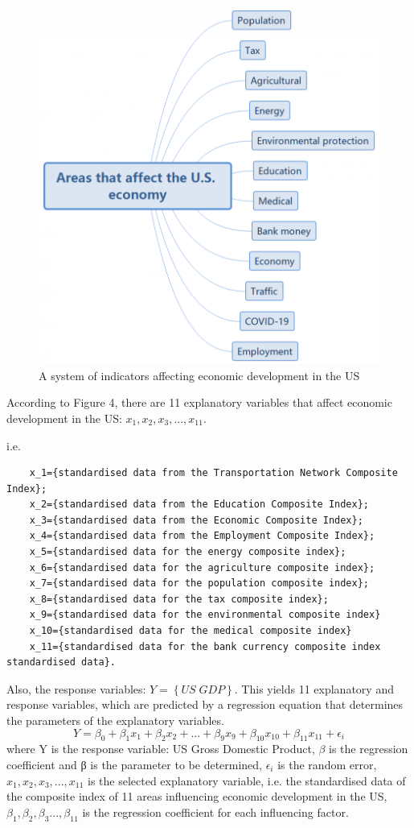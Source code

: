 \documentclass{apmcmthesis}
\begin{document}
\begin{figure}[H]
	\centering
	\includegraphics[width=0.65\linewidth]{screenshot005}
	\caption{A system of indicators affecting economic development in the US}
	\label{fig:screenshot005}
\end{figure}

According to Figure 4, there are 11 explanatory variables that affect economic development in the US: $ x_1,x_2,x_3,...,x_{11} $.

i.e.
\begin{lstlisting}
	x_1={standardised data from the Transportation Network Composite Index};
	x_2={standardised data from the Education Composite Index};
	x_3={standardised data from the Economic Composite Index};
	x_4={standardised data from the Employment Composite Index};
	x_5={standardised data for the energy composite index}; 
	x_6={standardised data for the agriculture composite index};
	x_7={standardised data for the population composite index}; 
	x_8={standardised data for the tax composite index}; 
	x_9={standardised data for the environmental composite index}
	x_10={standardised data for the medical composite index}
	x_11={standardised data for the bank currency composite index standardised data}. 
\end{lstlisting}

Also, the response variables: $ Y =\left\lbrace US\;GDP\right\rbrace  $. This yields 11 explanatory and response variables, which are predicted by a regression equation that determines the parameters of the explanatory variables. 
\begin{equation}
Y = \beta_0 + \beta_1x_1 + \beta_2x_2 + ...+ \beta_9x_9 + \beta_{10}x_{10} + \beta_{11}x_{11} + \epsilon_i
\end{equation}
where Y is the response variable: US Gross Domestic Product, $\beta $ is the regression coefficient and β is the parameter to be determined, $ \epsilon_i $ is the random error, $ x_1,x_2,x_3,...,x_{11} $ is the selected explanatory variable, i.e. the standardised data of the composite index of 11 areas influencing economic development in the US, $ \beta_1,\beta_2,\beta_3...,\beta_{11} $ is the regression coefficient for each influencing factor. 
\end{document}
